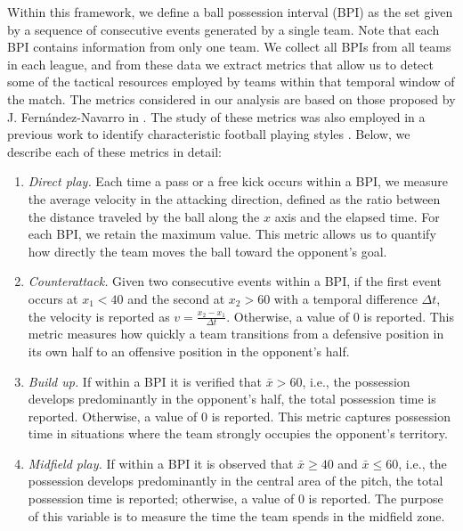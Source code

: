 \documentclass[preprint, amsmath,amssymb, pre]{revtex4-2}
\begin{document}
Within this framework, we define a ball possession interval (BPI) as the set given by a sequence of consecutive events generated by a single team. Note that each BPI contains information from only one team.  
We collect all BPIs from all teams in each league, and from these data we extract metrics that allow us to detect some of the tactical resources employed by teams within that temporal window of the match.  
The metrics considered in our analysis are based on those proposed by J. Fernández-Navarro in \cite{fernandez2018influence}. The study of these metrics was also employed in a previous work to identify characteristic football playing styles \cite{chacoma2025data}.  
Below, we describe each of these metrics in detail:

\begin{enumerate}
    \item {\it Direct play.} Each time a pass or a free kick occurs within a BPI, we measure the average velocity in the attacking direction, defined as the ratio between the distance traveled by the ball along the $x$ axis and the elapsed time. For each BPI, we retain the maximum value.  
    This metric allows us to quantify how directly the team moves the ball toward the opponent’s goal.

    \item {\it Counterattack.} Given two consecutive events within a BPI, if the first event occurs at $x_1<40$ and the second at $x_2>60$ with a temporal difference $\Delta t$, the velocity is reported as $v=\frac{x_2-x_1}{\Delta t}$. Otherwise, a value of $0$ is reported.  
    This metric measures how quickly a team transitions from a defensive position in its own half to an offensive position in the opponent’s half.

    \item {\it Build up.} If within a BPI it is verified that $\bar{x}>60$, i.e., the possession develops predominantly in the opponent’s half, the total possession time is reported. Otherwise, a value of $0$ is reported. This metric captures possession time in situations where the team strongly occupies the opponent’s territory.  

    \item {\it Midfield play.} If within a BPI it is observed that $\bar{x}\geq40$ and $\bar{x}\leq60$, i.e., the possession develops predominantly in the central area of the pitch, the total possession time is reported; otherwise, a value of $0$ is reported. The purpose of this variable is to measure the time the team spends in the midfield zone.


\end{enumerate}
\end{document}
